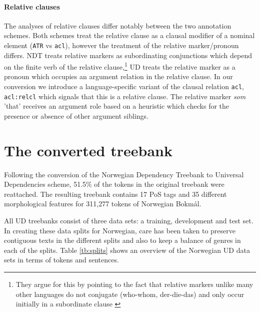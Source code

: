 \documentclass[10pt, a4paper]{article}
\begin{document}
\paragraph{Relative clauses}The analyses of relative clauses differ notably between the two
annotation schemes. Both schemes treat the relative clause as a
clausal modifier of a nominal element ({\tt ATR} vs {\tt acl}),
however the treatment of the relative marker/pronoun differs. NDT
treats relative markers as subordinating conjunctions which depend on
the finite verb of the relative clause,\footnote{They argue for this
  by pointing to the fact that relative markers unlike many other
  languages do not conjugate (who-whom, der-die-das) and only occur
  initially in a subordinate clause \cite{Faa:Lie:Van:97}} UD treats
the relative marker as a pronoun which occupies an argument relation
in the relative clause. In our conversion we introduce a
language-specific variant of the clausal relation {\tt acl}, {\tt
  acl:relcl} which signals that this is a relative clause. The
relative marker {\it som} 'that' receives an argument role based on a
heuristic which checks for the presence or absence of other argument
siblings.


\section{The converted treebank}
Following the conversion of the Norwegian Dependency Treebank to
Universal Dependencies scheme, 51.5\% of the tokens in the original treebank
were reattached. The resulting treebank contains 17 PoS tags and 35 different
morphological features for 311,277 tokens of Norwegian Bokmål.

All UD treebanks consist of three data sets: a training, development
and test set. In creating these data splits for Norwegian, care has
been taken to preserve contiguous texts in the different splits and
also to keep a balance of genres in each of the splits. Table
\ref{tb:splits} shows an overview of the Norwegian UD data sets in
terms of tokens and sentences.
\end{document}
